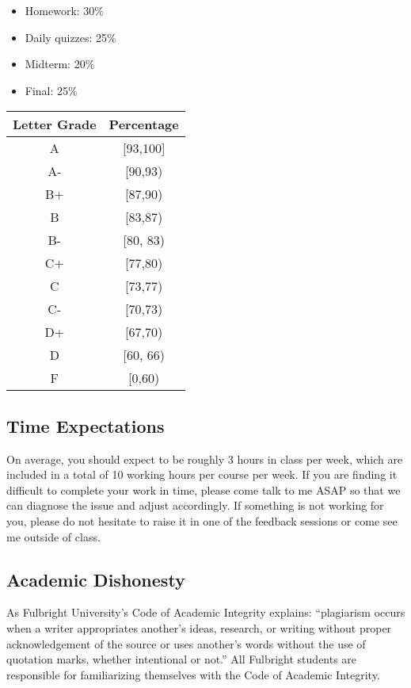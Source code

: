 \documentclass[
]{article}
\providecommand{\tightlist}{%
  \setlength{\itemsep}{0pt}\setlength{\parskip}{0pt}}
\begin{document}
\begin{itemize}
\tightlist
\item
  Homework: 30\%
\item
  Daily quizzes: 25\%
\item
  Midterm: 20\%
\item
  Final: 25\%
\end{itemize}

\begin{longtable}[]{@{}cc@{}}
\toprule\noalign{}
\textbf{Letter Grade} & \textbf{Percentage} \\
\midrule\noalign{}
\endhead
\bottomrule\noalign{}
\endlastfoot
A & {[}93,100{]} \\
A- & {[}90,93) \\
B+ & {[}87,90) \\
B & {[}83,87) \\
B- & {[}80, 83) \\
C+ & {[}77,80) \\
C & {[}73,77) \\
C- & {[}70,73) \\
D+ & {[}67,70) \\
D & {[}60, 66) \\
F & {[}0,60) \\
\end{longtable}

\hypertarget{time-expectations}{%
\subsection*{Time Expectations}\label{time-expectations}}

On average, you should expect to be roughly 3 hours in class per week, which are included in a total of 10 working hours per course per week. If you are finding it difficult to complete your work in time, please come talk to me ASAP so that we can diagnose the issue and adjust accordingly. If something is not working for you, please do not hesitate to raise it in one of the feedback sessions or come see me outside of class.

\hypertarget{academic-dishonesty}{%
\subsection*{Academic Dishonesty}\label{academic-dishonesty}}

As Fulbright University's Code of Academic Integrity explains: ``plagiarism occurs when a writer appropriates another's ideas, research, or writing without proper acknowledgement of the source or uses another's words without the use of quotation marks, whether intentional or not.'' All Fulbright students are responsible for familiarizing themselves with the Code of Academic Integrity.
\end{document}
